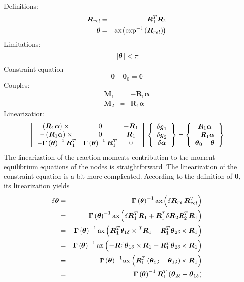 \documentclass[10pt,dvips,fleqn]{report}
\newcommand{\T}[1]{\boldsymbol{#1}}
\begin{document}
\noindent
Definitions:
\begin{eqnarray*}
	\T{R}_{rel} & = & \T{R}_1^T \T{R}_2 \\
	\T{\theta} & = & \llk{ax}\plbr{\llk{exp}^{-1}\plbr{\T{R}_{rel}}}
\end{eqnarray*}
Limitations:
\begin{equation}
	\nrbr{\T{\theta}} < \pi
\end{equation}
Constraint equation 
\begin{equation}
	\T{\theta} - \T{\theta}_0 = \T{0}
\end{equation}
Couples:
\begin{eqnarray*}
	\T{M}_1 & = & -\T{R}_1 \T{\alpha} \\
	\T{M}_2 & = & \T{R}_1 \T{\alpha}
\end{eqnarray*}
Linearization:
\begin{equation}
	\sqbr{\matr{ccc}{
		\plbr{\T{R}_1 \T{\alpha}}\times{} & 0 & -\T{R}_1 \\
		-\plbr{\T{R}_1 \T{\alpha}}\times{} & 0 & \T{R}_1 \\
		-\T{\Gamma}\plbr{\T{\theta}}^{-1} \T{R}_1^T &
			\T{\Gamma}\plbr{\T{\theta}}^{-1} \T{R}_1^T & 0
	}}\cubr{\cvvect{
		\delta\T{g}_1 \\
		\delta\T{g}_2 \\
		\delta\T{\alpha} \\
	}} = \cubr{\cvvect{
		\T{R}_1 \T{\alpha} \\
		-\T{R}_1 \T{\alpha} \\
		\T{\theta}_0 - \T{\theta}
	}}
\end{equation}
The linearization of the reaction moments contribution 
to the moment equilibrium equations of the nodes is straightforward.
The linearization of the constraint equation is a bit more complicated.
According to the definition of $\T{\theta}$, its linearization
yields
\begin{eqnarray*}
	\delta\T{\theta}
		& = & \T{\Gamma}\plbr{\T{\theta}}^{-1} 
			\llk{ax}\plbr{\delta\T{R}_{rel} \T{R}_{rel}^T} \\
		& = & \T{\Gamma}\plbr{\T{\theta}}^{-1} \llk{ax}\plbr{
			\delta\T{R}_1^T \T{R}_1
			+ \T{R}_1^T \delta\T{R}_2 \T{R}_2^T \T{R}_1
		} \\
		& = & \T{\Gamma}\plbr{\T{\theta}}^{-1} \llk{ax}\plbr{
			\T{R}_1^T \T{\theta}_{1\delta}\times{}^T \T{R}_1
			+ \T{R}_1^T \T{\theta}_{2\delta}\times{} \T{R}_1
		} \\
		& = & \T{\Gamma}\plbr{\T{\theta}}^{-1} \llk{ax}\plbr{
			- \T{R}_1^T \T{\theta}_{1\delta}\times{} \T{R}_1
			+ \T{R}_1^T \T{\theta}_{2\delta}\times{} \T{R}_1
		} \\
		& = & \T{\Gamma}\plbr{\T{\theta}}^{-1}
			\llk{ax} \plbr{
				\T{R}_1^T \plbr{
					\T{\theta}_{2\delta}
					- \T{\theta}_{1\delta}
				}\times \T{R}_1
			} \\
		& = & \T{\Gamma}\plbr{\T{\theta}}^{-1} \T{R}_1^T \plbr{
			\T{\theta}_{2\delta} - \T{\theta}_{1\delta}
		}
\end{eqnarray*}
\end{document}
